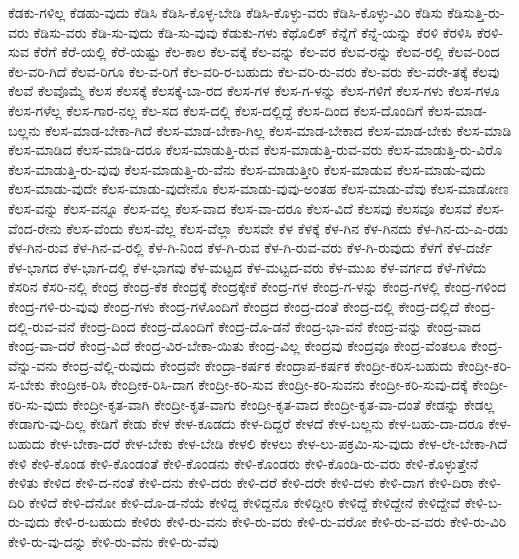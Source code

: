 {ಕೆಡಕು-ಗಳಿಲ್ಲ
ಕೆಡಹು-ವುದು
ಕೆಡಿಸಿ
ಕೆಡಿಸಿ-ಕೊಳ್ಳ-ಬೇಡಿ
ಕೆಡಿಸಿ-ಕೊಳ್ಳು-ವರು
ಕೆಡಿಸಿ-ಕೊಳ್ಳು-ವಿರಿ
ಕೆಡಿಸು
ಕೆಡಿಸುತ್ತಿ-ರು-ವರು
ಕೆಡಿಸು-ವರು
ಕೆಡಿ-ಸು-ವುದು
ಕೆಡಿ-ಸು-ವುವು
ಕೆಡುಕು-ಗಳು
ಕೆಥೊಲಿಕ್
ಕೆನ್ನೆಗೆ
ಕೆನ್ನೆ-ಯನ್ನು
ಕೆರಳಿ
ಕೆರಳಿಸಿ
ಕೆರಳಿ-ಸುವ
ಕೆರೆಗೆ
ಕೆರೆ-ಯಲ್ಲಿ
ಕೆರೆ-ಯಷ್ಟು
ಕೆಲ-ಕಾಲ
ಕೆಲ-ವಕ್ಕೆ
ಕೆಲ-ವನ್ನು
ಕೆಲ-ವರ
ಕೆಲವ-ರನ್ನು
ಕೆಲವ-ರಲ್ಲಿ
ಕೆಲವ-ರಿಂದ
ಕೆಲ-ವರಿ-ಗಿದೆ
ಕೆಲವ-ರಿಗೂ
ಕೆಲ-ವ-ರಿಗೆ
ಕೆಲ-ವರಿ-ರ-ಬಹುದು
ಕೆಲ-ವರಿ-ರು-ವರು
ಕೆಲ-ವರು
ಕೆಲ-ವರೇ-ತಕ್ಕೆ
ಕೆಲವು
ಕೆಲವೆ
ಕೆಲವೊಮ್ಮೆ
ಕೆಲಸ
ಕೆಲಸಕ್ಕೆ
ಕೆಲಸಕ್ಕೆ-ಬಾ-ರದ
ಕೆಲಸ-ಗಳ
ಕೆಲಸ-ಗ-ಳನ್ನು
ಕೆಲಸ-ಗಳಿಗೆ
ಕೆಲಸ-ಗಳು
ಕೆಲಸ-ಗಳೂ
ಕೆಲಸ-ಗಳೆಲ್ಲ
ಕೆಲಸ-ಗಾರ-ನಲ್ಲ
ಕೆಲ-ಸದ
ಕೆಲಸ-ದಲ್ಲಿ
ಕೆಲಸ-ದಲ್ಲಿದ್ದೆ
ಕೆಲಸ-ದಿಂದ
ಕೆಲಸ-ದೊಂದಿಗೆ
ಕೆಲಸ-ಮಾಡ-ಬಲ್ಲನು
ಕೆಲಸ-ಮಾಡ-ಬೇಕಾ-ಗಿದೆ
ಕೆಲಸ-ಮಾಡ-ಬೇಕಾ-ಗಿಲ್ಲ
ಕೆಲಸ-ಮಾಡ-ಬೇಕಾದ
ಕೆಲಸ-ಮಾಡ-ಬೇಕು
ಕೆಲಸ-ಮಾಡಿ
ಕೆಲಸ-ಮಾಡಿದ
ಕೆಲಸ-ಮಾಡಿ-ದರೂ
ಕೆಲಸ-ಮಾಡುತ್ತಿ-ರುವ
ಕೆಲಸ-ಮಾಡುತ್ತಿ-ರುವ-ವರು
ಕೆಲಸ-ಮಾಡುತ್ತಿ-ರು-ವಿರೊ
ಕೆಲಸ-ಮಾಡುತ್ತಿ-ರು-ವುವು
ಕೆಲಸ-ಮಾಡುತ್ತಿ-ರು-ವೆನು
ಕೆಲಸ-ಮಾಡುತ್ತೀರಿ
ಕೆಲಸ-ಮಾಡುವ
ಕೆಲಸ-ಮಾಡು-ವುದು
ಕೆಲಸ-ಮಾಡು-ವುದೇ
ಕೆಲಸ-ಮಾಡು-ವುದೇನೊ
ಕೆಲಸ-ಮಾಡು-ವುವು-ಅಂತಹ
ಕೆಲಸ-ಮಾಡು-ವೆವು
ಕೆಲಸ-ಮಾಡೋಣ
ಕೆಲಸ-ವನ್ನು
ಕೆಲಸ-ವನ್ನೂ
ಕೆಲಸ-ವಲ್ಲ
ಕೆಲಸ-ವಾದ
ಕೆಲಸ-ವಾ-ದರೂ
ಕೆಲಸ-ವಿದೆ
ಕೆಲಸವು
ಕೆಲಸವೂ
ಕೆಲಸವೆ
ಕೆಲಸ-ವೆಂದ-ರೇನು
ಕೆಲಸ-ವೆಂದು
ಕೆಲಸ-ವೆಲ್ಲ
ಕೆಲಸ-ವೆಲ್ಲಾ
ಕೆಲಸವೇ
ಕೆಳ
ಕೆಳಕ್ಕೆ
ಕೆಳ-ಗಿನ
ಕೆಳ-ಗಿನದು
ಕೆಳ-ಗಿನ-ದು-ಎ-ರಡು
ಕೆಳ-ಗಿನ-ರುವ
ಕೆಳ-ಗಿನ-ವ-ರಲ್ಲಿ
ಕೆಳ-ಗಿ-ನಿಂದ
ಕೆಳ-ಗಿ-ರುವ
ಕೆಳ-ಗಿ-ರುವ-ವರು
ಕೆಳ-ಗಿ-ರುವುದು
ಕೆಳಗೆ
ಕೆಳ-ದರ್ಜೆ
ಕೆಳ-ಭಾಗದ
ಕೆಳ-ಭಾಗ-ದಲ್ಲಿ
ಕೆಳ-ಭಾಗವು
ಕೆಳ-ಮಟ್ಟದ
ಕೆಳ-ಮಟ್ಟದ-ವರು
ಕೆಳ-ಮುಖ
ಕೆಳ-ವರ್ಗದ
ಕೆಳೆ-ಗೆಳೆದು
ಕೆಸರಿನ
ಕೆಸರಿ-ನಲ್ಲಿ
ಕೇಂದ್ರ
ಕೇಂದ್ರ-ಕೆಕ
ಕೇಂದ್ರಕ್ಕೆ
ಕೇಂದ್ರಕ್ಕೇಕೆ
ಕೇಂದ್ರ-ಗಳ
ಕೇಂದ್ರ-ಗ-ಳನ್ನು
ಕೇಂದ್ರ-ಗಳಲ್ಲಿ
ಕೇಂದ್ರ-ಗಳಿಂದ
ಕೇಂದ್ರ-ಗಳಿ-ರು-ವುವು
ಕೇಂದ್ರ-ಗಳು
ಕೇಂದ್ರ-ಗಳೊಂದಿಗೆ
ಕೇಂದ್ರದ
ಕೇಂದ್ರ-ದಂತೆ
ಕೇಂದ್ರ-ದಲ್ಲಿ
ಕೇಂದ್ರ-ದಲ್ಲಿದೆ
ಕೇಂದ್ರ-ದಲ್ಲಿ-ರುವ-ವನೆ
ಕೇಂದ್ರ-ದಿಂದ
ಕೇಂದ್ರ-ದೊಂದಿಗೆ
ಕೇಂದ್ರ-ದೊ-ಡನೆ
ಕೇಂದ್ರ-ಭಾ-ವನೆ
ಕೇಂದ್ರ-ವನ್ನು
ಕೇಂದ್ರ-ವಾದ
ಕೇಂದ್ರ-ವಾ-ದರೆ
ಕೇಂದ್ರ-ವಿದೆ
ಕೇಂದ್ರ-ವಿರ-ಬೇಕಾ-ಯಿತು
ಕೇಂದ್ರ-ವಿಲ್ಲ
ಕೇಂದ್ರವು
ಕೇಂದ್ರವೂ
ಕೇಂದ್ರ-ವೆಂತಲೂ
ಕೇಂದ್ರ-ವೆನ್ನು-ವನು
ಕೇಂದ್ರ-ವೆಲ್ಲಿ-ರುವುದು
ಕೇಂದ್ರವೇ
ಕೇಂದ್ರಾ-ಕರ್ಷಕ
ಕೇಂದ್ರಾಪ-ಕರ್ಷಕ
ಕೇಂದ್ರೀ-ಕರಿಸ-ಬಹುದು
ಕೇಂದ್ರೀ-ಕರಿ-ಸ-ಬೇಕು
ಕೇಂದ್ರೀಕ-ರಿಸಿ
ಕೇಂದ್ರೀಕ-ರಿಸಿ-ದಾಗ
ಕೇಂದ್ರೀ-ಕರಿ-ಸುವ
ಕೇಂದ್ರೀ-ಕರಿ-ಸುವನು
ಕೇಂದ್ರೀ-ಕರಿ-ಸುವು-ದಕ್ಕೆ
ಕೇಂದ್ರೀ-ಕರಿ-ಸು-ವುದು
ಕೇಂದ್ರೀ-ಕೃತ-ವಾಗಿ
ಕೇಂದ್ರೀ-ಕೃತ-ವಾಗು
ಕೇಂದ್ರೀ-ಕೃತ-ವಾದ
ಕೇಂದ್ರೀ-ಕೃತ-ವಾ-ದಂತೆ
ಕೇಡನ್ನು
ಕೇಡಲ್ಲ
ಕೇಡಾಗು-ವು-ದಿಲ್ಲ
ಕೇಡಿಗೆ
ಕೇಡು
ಕೇಳ
ಕೇಳ-ಕೂಡದು
ಕೇಳ-ದಿದ್ದರೆ
ಕೇಳದೆ
ಕೇಳ-ಬಲ್ಲನು
ಕೇಳ-ಬಹು-ದಾ-ದರೂ
ಕೇಳ-ಬಹುದು
ಕೇಳ-ಬೇಕಾ-ದರೆ
ಕೇಳ-ಬೇಕು
ಕೇಳ-ಬೇಡಿ
ಕೇಳಲಿ
ಕೇಳಲು
ಕೇಳ-ಲು-ಪಕ್ರಮಿ-ಸು-ವುದು
ಕೇಳ-ಲೇ-ಬೇಕಾ-ಗಿದೆ
ಕೇಳಿ
ಕೇಳಿ-ಕೊಂಡ
ಕೇಳಿ-ಕೊಂಡಂತೆ
ಕೇಳಿ-ಕೊಂಡನು
ಕೇಳಿ-ಕೊಂಡರು
ಕೇಳಿ-ಕೊಂಡಿ-ರು-ವರು
ಕೇಳಿ-ಕೊಳ್ಳುತ್ತೇನೆ
ಕೇಳಿತು
ಕೇಳಿದ
ಕೇಳಿ-ದ-ನಂತೆ
ಕೇಳಿ-ದನು
ಕೇಳಿ-ದರು
ಕೇಳಿ-ದರೆ
ಕೇಳಿ-ದರೇ
ಕೇಳಿ-ದಳು
ಕೇಳಿ-ದಾಗ
ಕೇಳಿ-ದಿರಾ
ಕೇಳಿ-ದಿರಿ
ಕೇಳಿದೆ
ಕೇಳಿ-ದೆನೋ
ಕೇಳಿ-ದೊ-ಡ-ನೆಯೆ
ಕೇಳಿದ್ದ
ಕೇಳಿದ್ದನೊ
ಕೇಳಿದ್ದೀರಿ
ಕೇಳಿದ್ದೆ
ಕೇಳಿದ್ದೇನೆ
ಕೇಳಿದ್ದೇವೆ
ಕೇಳಿ-ಬ-ರು-ವುದು
ಕೇಳಿ-ರ-ಬಹುದು
ಕೇಳಿರು
ಕೇಳಿ-ರು-ವನು
ಕೇಳಿ-ರು-ವರು
ಕೇಳಿ-ರು-ವರೋ
ಕೇಳಿ-ರು-ವ-ವರು
ಕೇಳಿ-ರು-ವಿರಿ
ಕೇಳಿ-ರು-ವು-ದನ್ನು
ಕೇಳಿ-ರು-ವೆನು
ಕೇಳಿ-ರು-ವೆವು
}

